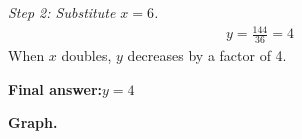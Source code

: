 \documentclass[11pt]{article}
\begin{document}
\textit{Step 2: Substitute \( x = 6 \).}
\[\begin{gathered}
y = \frac{144}{36} = 4
\end{gathered}\]
When \( x \) doubles, \( y \) decreases by a factor of 4.

\begin{answerbox}
\textbf{Final answer:}\quad \(\displaystyle  y = 4 \)
\end{answerbox}
\textbf{Graph.}

\begin{center}
\end{center}
\end{document}
